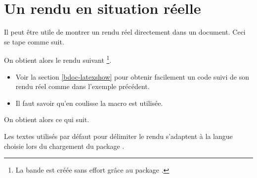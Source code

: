 

\usepackage[lang = french]{../main/main}
\usepackage{../macroenv/macroenv}
\usepackage{../listing/listing}
\usepackage{../rem-exa/rem-exa}


\usepackage{showcase}




\section{Un rendu en situation réelle}

\begin{bdocexa} 
    Il peut être utile de montrer un rendu réel directement dans un document.
    Ceci se tape comme suit.
    
    
	On obtient alors le rendu suivant
	\footnote{
    	La bande est créée sans effort grâce au package .
	}.

	\medskip
	
	
\end{bdocexa}


\begin{bdocrem}
	\leavevmode
	
	\begin{itemize}
	    \item Voir la section \ref{bdoc-latexshow} pour obtenir facilement un code suivi de son rendu réel comme dans l'exemple précédent.
	    
	    \item Il faut savoir qu'en coulisse la macro  est utilisée.
	\end{itemize}

    \begin{bdoclatex}[std]
	\end{bdoclatex}
\end{bdocrem}




\begin{bdocexa}
	\leavevmode


	On obtient alors ce qui suit.

	\medskip
	
	
\end{bdocexa}


\begin{bdocrem}
    Les textes utilisés par défaut  pour délimiter le rendu s'adaptent à la langue choisie lors du chargement du package .
\end{bdocrem}


